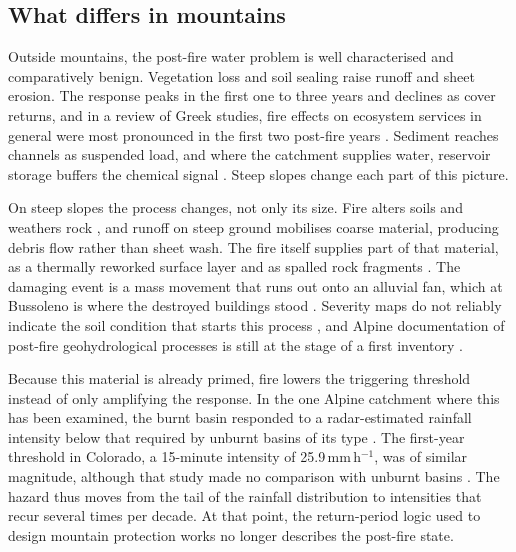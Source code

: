\documentclass[11pt,a4paper]{article}
\begin{document}
\subsection{What differs in mountains}

Outside mountains, the post-fire water problem is well characterised and comparatively benign. Vegetation loss and soil sealing raise runoff and sheet erosion. The response peaks in the first one to three years and declines as cover returns, and in a review of Greek studies, fire effects on ecosystem services in general were most pronounced in the first two post-fire years \citep{misseyanni_impact_2025}. Sediment reaches channels as suspended load, and where the catchment supplies water, reservoir storage buffers the chemical signal \citep{basso_potential_2021}. Steep slopes change each part of this picture.

On steep slopes the process changes, not only its size. Fire alters soils and weathers rock \citep{santi_wildfire_2022}, and runoff on steep ground mobilises coarse material, producing debris flow rather than sheet wash. The fire itself supplies part of that material, as a thermally reworked surface layer \citep{tiranti_wildfires_2021} and as spalled rock fragments \citep{pala_sediment_2025}. The damaging event is a mass movement that runs out onto an alluvial fan, which at Bussoleno is where the destroyed buildings stood \citep{laporta_postwildfire_2025}. Severity maps do not reliably indicate the soil condition that starts this process \citep{negri_wildfire_2026}, and Alpine documentation of post-fire geohydrological processes is still at the stage of a first inventory \citep{melzner_wildfire-induced_2025}.

Because this material is already primed, fire lowers the triggering threshold instead of only amplifying the response. In the one Alpine catchment where this has been examined, the burnt basin responded to a radar-estimated rainfall intensity below that required by unburnt basins of its type \citep{laporta_postwildfire_2025}. The first-year threshold in Colorado, a 15-minute intensity of 25.9\,mm\,h$^{-1}$, was of similar magnitude, although that study made no comparison with unburnt basins \citep{rengers_evaluating_2024}. The hazard thus moves from the tail of the rainfall distribution to intensities that recur several times per decade. At that point, the return-period logic used to design mountain protection works no longer describes the post-fire state.
\end{document}
